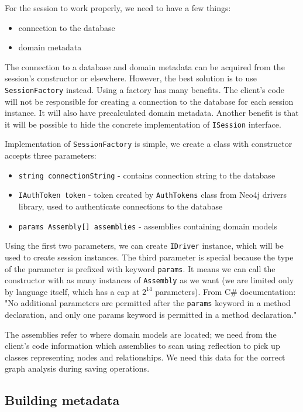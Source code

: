 For the session to work properly, we need to have a few things:

\begin{itemize}
    \item connection to the database
    \item domain metadata
\end{itemize}

The connection to a database and domain metadata can be acquired from the session's constructor or elsewhere. However,
the best solution is to use \texttt{SessionFactory} instead. Using a factory has many benefits. The client's code will not be responsible for
creating a connection to the database for each session instance. It will also have precalculated domain metadata. Another benefit is
that it will be possible to hide the concrete implementation of \texttt{ISession} interface.

Implementation of \texttt{SessionFactory} is simple, we create a class with constructor accepts three parameters:
\begin{itemize}
    \item {\texttt{string connectionString} - contains connection string to the database}
    \item {\texttt{IAuthToken token} - token created by \texttt{AuthTokens} class from Neo4j drivers library, used to authenticate connections to the database}
    \item {\texttt{params Assembly[] assemblies} - assemblies containing domain models}
\end{itemize}
Using the first two parameters, we can create \texttt{IDriver} instance, which will be used to create session instances. The third parameter is special
because the type of the parameter is prefixed with keyword \texttt{params}. It means we can call the constructor with as many instances of \texttt{Assembly} as we want
(we are limited only by language itself, which has a cap at $2^{14}$ parameters). From C\# documentation:
"No additional parameters are permitted after the \texttt{params} keyword in a method declaration, and only one params keyword is permitted in a method declaration." \cite{billwagner_params_nodate}

The assemblies refer to where domain models are located; we need from the client's code information which assemblies to scan using reflection to pick up classes
representing nodes and relationships. We need this data for the correct graph analysis during saving operations.

\subsection {Building metadata}


